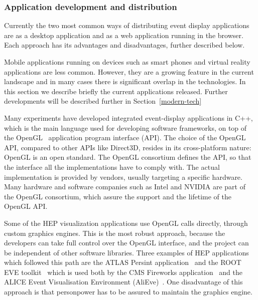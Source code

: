\documentclass[12pt,a4paper]{article}
\begin{document}

\hypertarget{application-development}{%
\subsubsection{Application development and distribution}\label{application-development}}

Currently the two most common ways of distributing event display applications are as a desktop application and as a web
application running in the browser. Each approach has its advantages and disadvantages, further described below.

Mobile applications running on devices such as smart phones and virtual reality applications are less common. However,
they are a growing feature in the current landscape and in many cases there is significant overlap in the technologies.
In this section we describe briefly the current applications released. Further developments will be described further in
Section~\ref{modern-tech}

Many experiments have developed integrated event-display applications in C++, which is the main language used for developing
software frameworks, on top of the OpenGL~\cite{OpenGL1992} application program interface (API).
The choice of the OpenGL API, compared to other APIs like Direct3D, resides in its cross-platform nature:
OpenGL is an open standard. The OpenGL consortium defines the API, so that the interface all the implementations have to
comply with. The actual implementation is provided by vendors, usually targeting a specific hardware. Many hardware and
software companies such as Intel and NVIDIA are part of the OpenGL consortium, which assure
the support and the lifetime of the OpenGL API.

Some of the HEP visualization applications use OpenGL calls directly, through custom graphics engines. This is the most
robust approach, because the developers can take full control over the OpenGL interface,
and the project can be independent of other software libraries. Three examples of  HEP applications which followed this path are the
ATLAS Persint application~\cite{ATLASPersint2012} and the ROOT EVE toolkit~\cite{ROOTEVE2007} which is used both by the CMS
Fireworks application~\cite{CMSFireworks} and the ALICE Event Visualisation Environment (AliEve)~\cite{alieve}.
One disadvantage of this approach is that personpower has to be assured to maintain the graphics engine.
\end{document}
